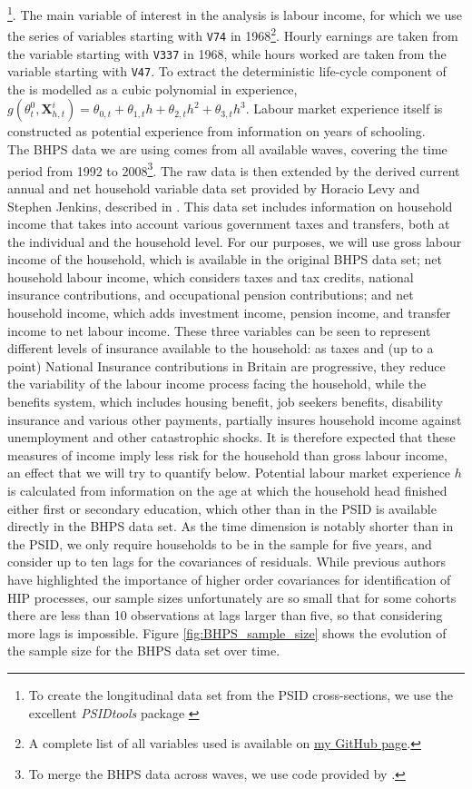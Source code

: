 \footnote{To create the longitudinal data set from the PSID cross-sections, we
use the excellent \textit{PSIDtools} package \citep{Kohler2015}}. The main
variable of interest in the analysis is labour income, for which we use the
series of variables starting with \texttt{V74} in 1968\footnote{A complete list
of all variables used is available on
\href{https://github.com/nilshg/psidJulia/blob/master/create_panel.do}{my GitHub
page}.}. Hourly earnings are taken from the variable starting with \texttt{V337}
in 1968, while hours worked are taken from the variable starting with
\texttt{V47}. To extract the deterministic life-cycle component of the is 
modelled as a cubic polynomial in experience,
$g(\theta_t^0, \pmb{X}_{h,t}^i) = \theta_{0,t} + \theta_{1,t} h 
+ \theta_{2,t} h^2 + \theta_{3,t} h^3$. Labour market experience itself is 
constructed as potential experience from information on years of schooling. 
 \\
The BHPS data we are using comes from all available waves, covering the time 
period from 1992 to 2008\footnote{To merge the BHPS data across waves, we use 
code provided by \citet{Vandendriessche2015}.}. The raw data is then extended by
the derived current annual and net household variable data set provided by 
Horacio Levy and Stephen Jenkins, described in \citet{Jenkins2010}. This data set 
includes information on household income 
that takes into account various government taxes and transfers, both at the 
individual and the household level. For our purposes, we will use gross labour
income of the household, which is available in the original BHPS data set;
net household labour income, which considers taxes and tax credits, national
insurance contributions, and occupational pension contributions; and net 
household income, which adds investment income, pension income, and transfer
income to net labour income. These three variables can be seen to represent 
different levels of insurance available to the household: as taxes and (up to 
a point) National Insurance contributions in Britain are progressive, they reduce
the variability of the labour income process facing the household, while the
benefits system, which includes housing benefit, job seekers benefits, disability
insurance and various other payments, partially insures household income against
unemployment and other catastrophic shocks. It is therefore expected that these
measures of income imply less risk for the household than gross labour income,
an effect that we will try to quantify below.
Potential labour market experience $h$ is calculated from information on the age
at which the household head finished either first or secondary education, which
other than in the PSID is available directly in the BHPS data set. 
As the time dimension is notably 
shorter than in the PSID, we only require households to be in the sample 
for five years, and consider up to ten lags for the covariances of residuals. 
While previous authors have highlighted the importance of higher order covariances
for identification of HIP processes, our sample sizes unfortunately are so small
that for some cohorts there are less than 10 observations at lags larger than
five, so that considering more lags is impossible. Figure \ref{fig:BHPS_sample_size}
shows the evolution of the sample size for the BHPS data set over time.

